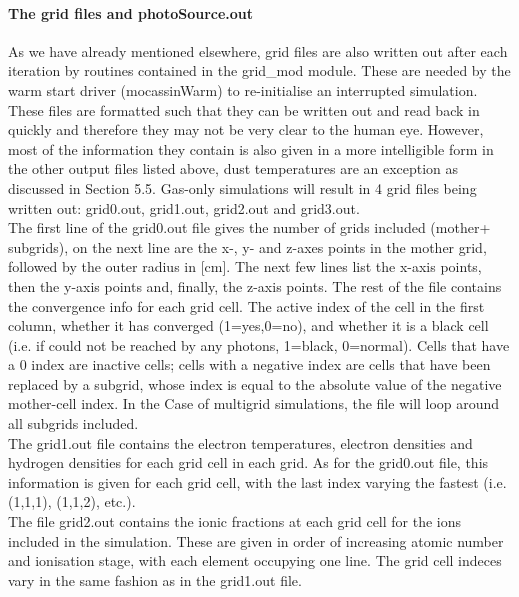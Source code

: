 \documentclass[11pt]{article}
\begin{document}
\paragraph{    The grid files and photoSource.out}
    As we have already mentioned elsewhere, grid files are also written out 
    after each iteration by routines contained in the grid\_mod module. These are 
    needed by the warm start driver (mocassinWarm) to re-initialise an 
    interrupted simulation. These files are 
    formatted such that they can be written out and read back in quickly and 
    therefore they may not be very clear to the human eye. However,  most of the 
    information they contain is also given in a more intelligible form in the other
    output files listed above, dust temperatures are an exception as discussed 
    in Section 5.5. Gas-only simulations will result in 4 grid files being written out:
    grid0.out, grid1.out, grid2.out and grid3.out. \\
        The first line of the grid0.out file gives the number of grids included (mother+
   subgrids), on the next line are the x-, y- and z-axes points in the mother grid, 
   followed by the outer radius in [cm]. 
   The next few lines list the x-axis points, then the y-axis points and, 
   finally, the z-axis points. The rest of the file contains the convergence info 
    for each grid cell. The active index of the cell in the first column, whether it 
    has converged (1=yes,0=no), and whether it is a black cell (i.e. if could not 
    be reached by any photons, 1=black, 0=normal). Cells that have a 0 index are 
    inactive cells; cells with a negative index are cells that have been replaced 
    by a subgrid, whose index is equal to the absolute value of the negative 
    mother-cell index. 
    In the Case of multigrid simulations, the file will loop around all subgrids
    included.\\
    The grid1.out file contains the electron temperatures,
    electron densities and hydrogen densities for each grid cell in each grid. 
    As for the grid0.out file, this information
    is given for each grid cell, with the last index varying the fastest 
    (i.e. (1,1,1), (1,1,2), etc.). \\
    The file grid2.out contains the ionic fractions
    at each grid cell for the ions included in the simulation. These are given in 
    order of increasing atomic number and ionisation stage, with each element 
    occupying one line. The grid cell indeces vary in the same fashion as in the 
    grid1.out file. \\
\end{document}
